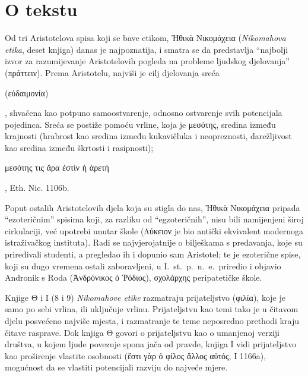 


\section*{O tekstu}

Od tri Aristotelova spisa koji se bave etikom, Ἠθικὰ Νικομάχεια (\textit{Nikomahova etika}, deset knjiga) danas je najpoznatija, i smatra se da predstavlja ``najbolji izvor za razumijevanje Aristotelovih pogleda na probleme ljudskog djelovanja'' (πράττειν). Prema Aristotelu, najviši je cilj djelovanja sreća \begin{greek}(εὐδαιμονία)\end{greek}, shvaćena kao potpuno samoostvarenje, odnosno ostvarenje svih potencijala pojedinca. Sreća se postiže pomoću vrline, koja je μεσότης, sredina između krajnosti (hrabrost kao sredina između kukavičluka i neopreznosti, darežljivost kao sredina između škrtosti i rasipnosti); \begin{greek}μεσότης τις ἄρα ἐστὶν ἡ ἀρετή\end{greek}, Eth. Nic. 1106b.

Poput ostalih Aristotelovih djela koja su stigla do nas, Ἠθικὰ Νικομάχεια pripada ``ezoteričnim'' spisima koji, za razliku od ``egzoteričnih'', nisu bili namijenjeni široj cirkulaciji, već upotrebi unutar škole (Λύκειον je bio antički ekvivalent modernoga istraživačkog instituta). Radi se najvjerojatnije o bilješkama s predavanja, koje su priređivali studenti, a pregledao ih i dopunio sam Aristotel; te je ezoterične spise, koji su dugo vremena ostali zaboravljeni, u I.~st.\ p.~n.~e.\ priredio i objavio Andronik s Roda (Ἀνδρόνικος ὁ Ῥόδιος), σχολάρχης peripatetičke škole.

Knjige Θ i Ι (8 i 9) \textit{Nikomahove etike} razmatraju prijateljstvo (φιλία), koje je samo po sebi vrlina, ili uključuje vrlinu. Prijateljstvu kao temi tako je u čitavom djelu posvećeno najviše mjesta, i razmatranje te teme neposredno prethodi kraju čitave rasprave. Dok knjiga Θ govori o prijateljstvu kao o umanjenoj verziji društva, u kojem ljude povezuje spona jača od pravde, knjiga Ι vidi prijateljstvo kao proširenje vlastite osobnosti (ἔστι γὰρ ὁ φίλος ἄλλος αὐτός, Ι 1166a), mogućnost da se vlastiti potencijali razviju do najveće mjere.

